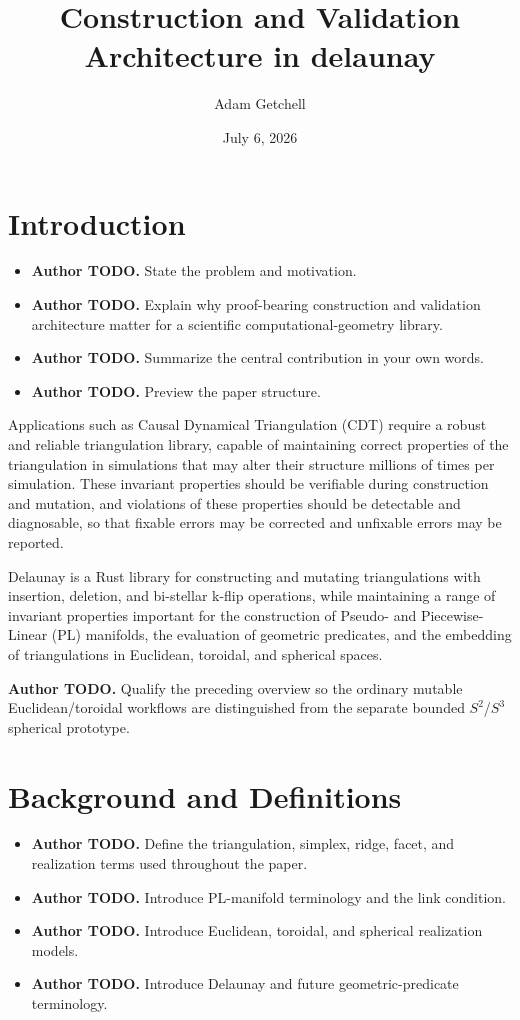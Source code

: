 \documentclass[manuscript,nonacm]{acmart}
\title{Construction and Validation Architecture in delaunay}
\author{Adam Getchell}
\affiliation{%
  \institution{The George Washington University}
  \city{Washington}
  \state{DC}
  \country{USA}
}
\date{July 6, 2026}
\newcommand{\AuthorTodo}[1]{\textbf{Author TODO.} #1}
\begin{document}
\maketitle

\section{Introduction}

\begin{itemize}
  \item \AuthorTodo{State the problem and motivation.}
  \item \AuthorTodo{Explain why proof-bearing construction and validation
    architecture matter for a scientific computational-geometry library.}
  \item \AuthorTodo{Summarize the central contribution in your own words.}
  \item \AuthorTodo{Preview the paper structure.}
\end{itemize}

Applications such as Causal Dynamical Triangulation (CDT) require a robust and
reliable triangulation library, capable of maintaining correct properties of the
triangulation in simulations that may alter their structure millions
of times per
simulation.
These invariant properties should be verifiable during construction
and mutation,
and violations of these properties should be detectable and diagnosable, so that
fixable errors may be corrected and unfixable errors may be reported.

Delaunay is a Rust library for constructing and mutating triangulations with
insertion, deletion, and bi-stellar k-flip operations, while maintaining a range
of invariant properties important for the construction of Pseudo- and
Piecewise-Linear (PL) manifolds,
the evaluation of geometric predicates, and the embedding of
triangulations in Euclidean,
toroidal, and spherical spaces.

\AuthorTodo{Qualify the preceding overview so the ordinary mutable
  Euclidean/toroidal workflows are distinguished from the separate bounded
\(S^2\)/\(S^3\) spherical prototype.}

\section{Background and Definitions}

\begin{itemize}
  \item \AuthorTodo{Define the triangulation, simplex, ridge, facet, and
    realization terms used throughout the paper.}
  \item \AuthorTodo{Introduce PL-manifold terminology and the link condition.}
  \item \AuthorTodo{Introduce Euclidean, toroidal, and spherical realization
    models.}
  \item \AuthorTodo{Introduce Delaunay and future geometric-predicate
    terminology.}
\end{itemize}
\end{document}
